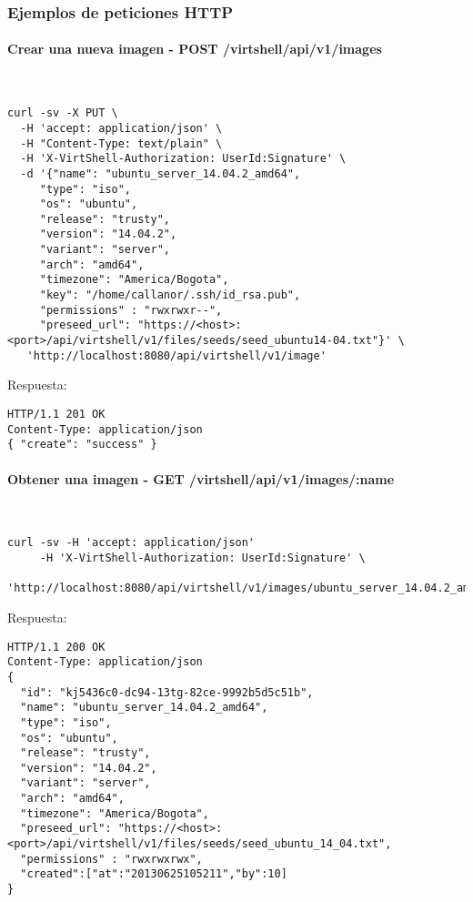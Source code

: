 \subsubsection{Ejemplos de peticiones HTTP}

\paragraph{Crear una nueva imagen - POST /virtshell/api/v1/images} ~\\

\begin{lstlisting}[style=json]
curl -sv -X PUT \
  -H 'accept: application/json' \
  -H "Content-Type: text/plain" \
  -H 'X-VirtShell-Authorization: UserId:Signature' \
  -d '{"name": "ubuntu_server_14.04.2_amd64",
     "type": "iso",
     "os": "ubuntu", 
     "release": "trusty",
     "version": "14.04.2", 
     "variant": "server", 
     "arch": "amd64", 
     "timezone": "America/Bogota", 
     "key": "/home/callanor/.ssh/id_rsa.pub",
     "permissions" : "rwxrwxr--",
     "preseed_url": "https://<host>:<port>/api/virtshell/v1/files/seeds/seed_ubuntu14-04.txt"}' \
   'http://localhost:8080/api/virtshell/v1/image'
\end{lstlisting}

\vspace{1cm}
Respuesta:
\vspace{1cm}

\begin{lstlisting}[style=json]
HTTP/1.1 201 OK
Content-Type: application/json
{ "create": "success" }
\end{lstlisting}

\paragraph{Obtener una imagen - GET /virtshell/api/v1/images/:name} ~\\

\begin{lstlisting}[style=json]
curl -sv -H 'accept: application/json' 
     -H 'X-VirtShell-Authorization: UserId:Signature' \ 
     'http://localhost:8080/api/virtshell/v1/images/ubuntu_server_14.04.2_amd64'
\end{lstlisting}

\vspace{1cm}
Respuesta:
\vspace{1cm}

\begin{lstlisting}[style=json]
HTTP/1.1 200 OK
Content-Type: application/json
{
  "id": "kj5436c0-dc94-13tg-82ce-9992b5d5c51b",
  "name": "ubuntu_server_14.04.2_amd64",
  "type": "iso",
  "os": "ubuntu", 
  "release": "trusty",
  "version": "14.04.2", 
  "variant": "server", 
  "arch": "amd64", 
  "timezone": "America/Bogota", 
  "preseed_url": "https://<host>:<port>/api/virtshell/v1/files/seeds/seed_ubuntu_14_04.txt",
  "permissions" : "rwxrwxrwx",
  "created":["at":"20130625105211","by":10]
}
\end{lstlisting}

